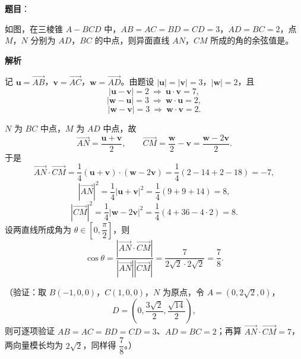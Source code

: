 \begin{answer}

\textbf{题目}：

如图，在三棱锥 \(A-BCD\) 中，\(AB=AC=BD=CD=3\)，\(AD=BC=2\)，点 \(M\)，\(N\) 分别为 \(AD\)，\(BC\) 的中点，则异面直线 \(AN\)，\(CM\) 所成的角的余弦值是\gkblank{}。
\nopagebreak[4]
\begin{center}\end{center}
\nopagebreak[4]
\textbf{解析}

记 \(\boldsymbol{u}=\overrightarrow{AB}\)，\(\boldsymbol{v}=\overrightarrow{AC}\)，\(\boldsymbol{w}=\overrightarrow{AD}\)。由题设 \(|\boldsymbol{u}|=|\boldsymbol{v}|=3\)，\(|\boldsymbol{w}|=2\)，且
\nopagebreak[4]
\[
|\boldsymbol{u}-\boldsymbol{v}|=2\ \Longrightarrow\ \boldsymbol{u}\cdot\boldsymbol{v}=7,
\]
\nopagebreak[4]
\[
|\boldsymbol{w}-\boldsymbol{u}|=3\ \Longrightarrow\ \boldsymbol{w}\cdot\boldsymbol{u}=2,
\]
\nopagebreak[4]
\[
|\boldsymbol{w}-\boldsymbol{v}|=3\ \Longrightarrow\ \boldsymbol{w}\cdot\boldsymbol{v}=2.
\]

\(N\) 为 \(BC\) 中点，\(M\) 为 \(AD\) 中点，故
\nopagebreak[4]
\[
\overrightarrow{AN}=\frac{\boldsymbol{u}+\boldsymbol{v}}{2},\qquad
\overrightarrow{CM}=\frac{\boldsymbol{w}}{2}-\boldsymbol{v}=\frac{\boldsymbol{w}-2\boldsymbol{v}}{2}.
\]
于是
\nopagebreak[4]
\[
\overrightarrow{AN}\cdot\overrightarrow{CM}
=\frac14\left(\boldsymbol{u}+\boldsymbol{v}\right)\cdot\left(\boldsymbol{w}-2\boldsymbol{v}\right)
=\frac14\left(2-14+2-18\right)=-7,
\]
\nopagebreak[4]
\[
|\overrightarrow{AN}|^2=\frac14|\boldsymbol{u}+\boldsymbol{v}|^2=\frac14(9+9+14)=8,
\]
\nopagebreak[4]
\[
|\overrightarrow{CM}|^2=\frac14|\boldsymbol{w}-2\boldsymbol{v}|^2=\frac14(4+36-4\cdot2)=8.
\]
设两直线所成角为 \(\theta\in\left[0,\dfrac{\pi}{2}\right]\)，则
\nopagebreak[4]
\[
\cos\theta=\frac{|\overrightarrow{AN}\cdot\overrightarrow{CM}|}{|\overrightarrow{AN}||\overrightarrow{CM}|}
=\frac{7}{2\sqrt2\cdot2\sqrt2}=\frac78.
\]

（验证：取 \(B(-1,0,0)\)，\(C(1,0,0)\)，\(N\) 为原点，令 \(A=(0,2\sqrt2,0)\)，
\nopagebreak[4]
\[
D=\left(0,\frac{3\sqrt2}{2},\frac{\sqrt{14}}{2}\right),
\]
则可逐项验证 \(AB=AC=BD=CD=3\)、\(AD=BC=2\)；再算 \(\overrightarrow{AN}\cdot\overrightarrow{CM}=7\)，两向量模长均为 \(2\sqrt2\)，同样得 \(\dfrac78\)。）


\end{answer}
